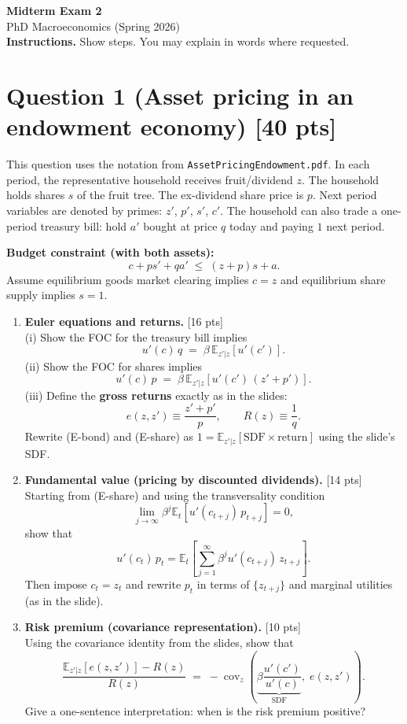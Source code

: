 \documentclass[12pt]{article}
\newcommand{\pts}[1]{\hfill{\small[#1 pts]}}
\newcommand{\E}{\mathbb{E}}
\newcommand{\covz}{\operatorname{cov}_z}
\begin{document}
\begin{center}
{\Large \textbf{Midterm Exam 2}}\\
PhD Macroeconomics (Spring 2026)\\
\textbf{Instructions.} Show steps. You may explain in words where requested.\\
\end{center}

\section*{Question 1 (Asset pricing in an endowment economy) \pts{40}}

This question uses the notation from \texttt{AssetPricingEndowment.pdf}.
In each period, the representative household receives fruit/dividend \(z\).
The household holds shares \(s\) of the fruit tree. The ex-dividend share price is \(p\).
Next period variables are denoted by primes: \(z'\), \(p'\), \(s'\), \(c'\).
The household can also trade a one-period treasury bill: hold \(a'\) bought at price \(q\) today and paying \(1\) next period.

\medskip
\noindent\textbf{Budget constraint (with both assets):}
\[
c + p s' + q a' \;\le\; (z+p)s + a.
\tag{BC}
\]
Assume equilibrium goods market clearing implies \(c=z\) and equilibrium share supply implies \(s=1\).

\begin{enumerate}[label=(\alph*)]
\item \textbf{Euler equations and returns.} \pts{16}\\
(i) Show the FOC for the treasury bill implies
\[
u'(c)\,q \;=\; \beta\,\E_{z'|z}\!\left[u'(c')\right].
\tag{E-bond}
\]
(ii) Show the FOC for shares implies
\[
u'(c)\,p \;=\; \beta\,\E_{z'|z}\!\left[u'(c')\,(z'+p')\right].
\tag{E-share}
\]
(iii) Define the \textbf{gross returns} exactly as in the slides:
\[
e(z,z') \equiv \frac{z'+p'}{p},
\qquad
R(z)\equiv \frac{1}{q}.
\]
Rewrite (E-bond) and (E-share) as \(1=\E_{z'|z}[\text{SDF}\times \text{return}]\) using the slide's SDF.

\item \textbf{Fundamental value (pricing by discounted dividends).} \pts{14}\\
Starting from (E-share) and using the transversality condition
\[
\lim_{j\to\infty}\beta^j \E_t\!\left[u'(c_{t+j})\,p_{t+j}\right]=0,
\tag{TVC}
\]
show that
\[
u'(c_t)\,p_t
=
\E_t\!\left[\sum_{j=1}^{\infty}\beta^j u'(c_{t+j})\,z_{t+j}\right].
\tag{FV}
\]
Then impose \(c_t=z_t\) and rewrite \(p_t\) in terms of \(\{z_{t+j}\}\) and marginal utilities (as in the slide).

\item \textbf{Risk premium (covariance representation).} \pts{10}\\
Using the covariance identity from the slides, show that
\[
\frac{\E_{z'|z}[e(z,z')] - R(z)}{R(z)}
\;=\;
-\covz\!\left(\underbrace{\beta\frac{u'(c')}{u'(c)}}_{\text{SDF}},\;e(z,z')\right).
\tag{RP}
\]
Give a one-sentence interpretation: when is the risk premium positive?
\end{enumerate}
\end{document}
